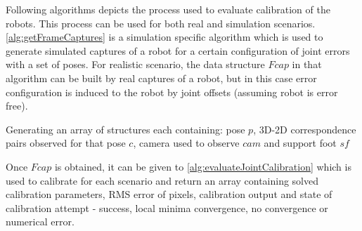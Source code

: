 \documentclass[english, printversion, nomenclature, notitle]{tuvisionthesis} %
\begin{document}
Following algorithms depicts the process used to evaluate calibration of the robots. This process can be used for both real and simulation scenarios. \cref{alg:getFrameCaptures} is a simulation specific algorithm which is used to generate simulated captures of a robot for a certain configuration of joint errors with a set of poses. For realistic scenario, the data structure $Fcap$ in that algorithm can be built by real captures of a robot, but in this case error configuration is induced to the robot by joint offsets (assuming robot is error free). 

\begin{algorithm}[]
	\caption{Generating an array of structures each containing: pose $p$, 3D-2D correspondence pairs observed for that pose $c$, camera used to observe $cam$ and support foot $sf$}	\label{alg:getFrameCaptures}
	\BlankLine
\end{algorithm}

Once $Fcap$ is obtained, it can be given to \cref{alg:evaluateJointCalibration} which is used to calibrate for each scenario and return an array containing solved calibration parameters, RMS error of pixels, calibration output and state of calibration attempt - success, local minima convergence, no convergence or numerical error.
\end{document}
